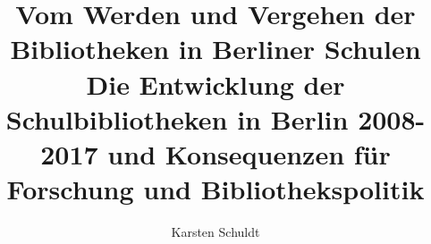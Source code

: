 
\fancyhead[R]{\thepage} %

\title{\LARGE{Vom Werden und Vergehen der Bibliotheken in Berliner Schulen\\}Die Entwicklung der Schulbibliotheken in Berlin 2008-2017 und
    Konsequenzen für Forschung und Bibliothekspolitik} %
\author{Karsten Schuldt} %

\setcounter{page}{1}